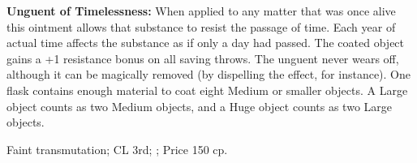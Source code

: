 







\textbf{Unguent of Timelessness:} When applied to any matter that was once alive this ointment allows that substance to resist the passage of time. Each year of actual time affects the substance as if only a day had passed. The coated object gains a +1 resistance bonus on all saving throws. The unguent never wears off, although it can be magically removed (by dispelling the effect, for instance). One flask contains enough material to coat eight Medium or smaller objects. A Large object counts as two Medium objects, and a Huge object counts as two Large objects.

Faint transmutation; CL 3rd; ; Price 150 cp.




